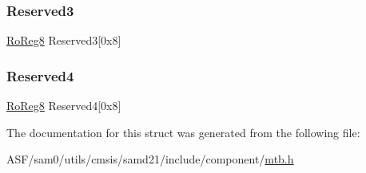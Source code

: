 \mbox{\label{struct_mtb_aa6dedadaa878ede1a7a75ee4c823f3b7}} 
\subsubsection{\texorpdfstring{Reserved3}{Reserved3}}
{\footnotesize\ttfamily \mbox{\hyperlink{group___s_a_m_d21_e15_a__definitions_ga0d957f1433aaf5d70e4dc2b68288442d}{Ro\+Reg8}} Reserved3\mbox{[}0x8\mbox{]}}

\mbox{\label{struct_mtb_ab7b3e550ab30de0179365b0293537564}} 
\subsubsection{\texorpdfstring{Reserved4}{Reserved4}}
{\footnotesize\ttfamily \mbox{\hyperlink{group___s_a_m_d21_e15_a__definitions_ga0d957f1433aaf5d70e4dc2b68288442d}{Ro\+Reg8}} Reserved4\mbox{[}0x8\mbox{]}}



The documentation for this struct was generated from the following file\+:\begin{DoxyCompactItemize}
\item 
A\+S\+F/sam0/utils/cmsis/samd21/include/component/\mbox{\hyperlink{component_2mtb_8h}{mtb.\+h}}\end{DoxyCompactItemize}
